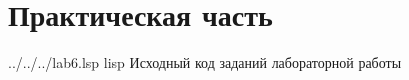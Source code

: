 \chapter*{Практическая часть}

	{../../../lab6.lsp} %
	{lisp} %
	{Исходный код заданий лабораторной работы} %